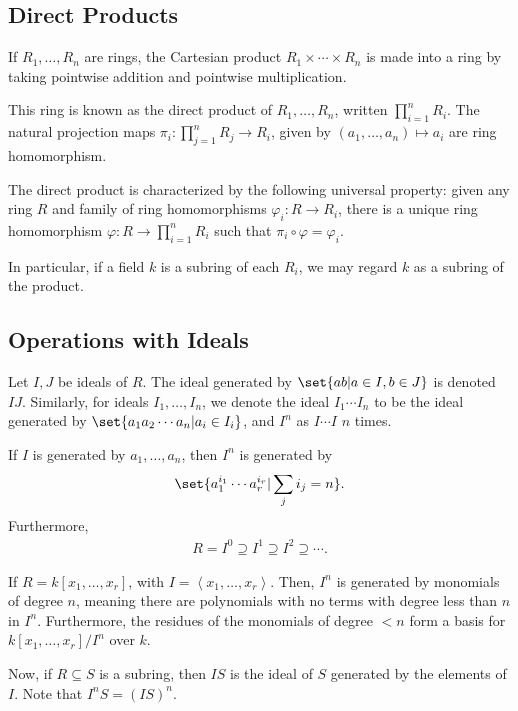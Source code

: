\documentclass[10pt]{mypackage}
\begin{document}
\subsection{Direct Products}%
If $R_1,\dots,R_n$ are rings, the Cartesian product $R_1\times\cdots\times R_n$ is made into a ring by taking pointwise addition and pointwise multiplication.\newline

This ring is known as the direct product of $R_1,\dots,R_n$, written $\prod_{i=1}^{n}R_i$. The natural projection maps $\pi_i\colon \prod_{j=1}^{n}R_j\rightarrow R_i$, given by $\left( a_1,\dots,a_n \right)\mapsto a_i$ are ring homomorphism.\newline

The direct product is characterized by the following universal property: given any ring $R$ and family of ring homomorphisms $\varphi_i\colon R\rightarrow R_i$, there is a unique ring homomorphism $\varphi\colon R\rightarrow \prod_{i=1}^{n}R_i$ such that $\pi_i\circ\varphi = \varphi_i$.\newline

In particular, if a field $k$ is a subring of each $R_i$, we may regard $k$ as a subring of the product.
\subsection{Operations with Ideals}%
Let $I,J$ be ideals of $R$. The ideal generated by $\set{ab | a\in I,b\in J}$ is denoted $IJ$. Similarly, for ideals $I_1,\dots,I_n$, we denote the ideal $I_1\cdots I_n $ to be the ideal generated by $ \set{a_1a_2\cdots a_n | a_i\in I_i}$, and $I^{n}$ as $I\cdots I$ $n$ times.\newline

If $I$ is generated by $a_1,\dots,a_n$, then $I^{n}$ is generated by
\begin{align*}
  \set{a_1^{i_1}\cdots a_r^{i_r} | \sum_{j}i_j = n}.
\end{align*}
Furthermore,
\begin{align*}
  R= I^0\supseteq I^1\supseteq I^2\supseteq \cdots.
\end{align*}
\begin{example}
  If $R = k\left[ x_1,\dots,x_r \right]$, with $I = \left\langle x_1,\dots,x_r \right\rangle$. Then, $I^n$ is generated by monomials of degree $n$, meaning there are polynomials with no terms with degree less than $n$ in $I^n$. Furthermore, the residues of the monomials of degree $< n$ form a basis for $k\left[ x_1,\dots,x_r \right]/I^n$ over $k$.
\end{example}
Now, if $R\subseteq S$ is a subring, then $IS$ is the ideal of $S$ generated by the elements of $I$. Note that $I^{n}S = \left( IS \right)^{n}$.\newline
\end{document}
